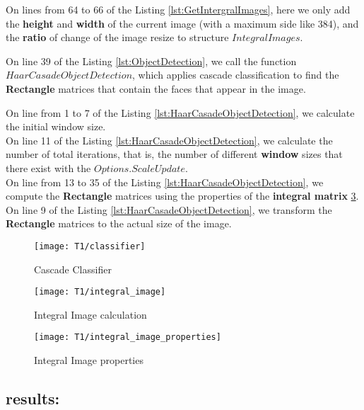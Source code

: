 \noindent On lines from 64 to 66 of the Listing \ref{lst:GetIntergralImages}, here we only add the \textbf{height} and \textbf{width} of the current image (with a maximum side like 384), and the \textbf{ratio} of change of the image resize to structure $IntegralImages$.

\noindent On line 39 of the Listing \ref{lst:ObjectDetection}, we call the function $HaarCasadeObjectDetection$, which applies cascade classification to find the \textbf{Rectangle} matrices that contain the faces that appear in the image.

\noindent On line from 1 to 7 of the Listing \ref{lst:HaarCasadeObjectDetection}, we calculate the initial window size.\\

\noindent On line 11  of the Listing \ref{lst:HaarCasadeObjectDetection}, we calculate the number of total iterations, that is, the number of different \textbf{window} sizes that there exist with the $Options.ScaleUpdate$.\\

\noindent On line from 13 to 35 of the Listing \ref{lst:HaarCasadeObjectDetection}, we compute the \textbf{Rectangle} matrices using the properties of the \textbf{integral matrix} \ref{fig:integral_properties}.\\

\noindent On line 9  of the Listing \ref{lst:HaarCasadeObjectDetection}, we transform the \textbf{Rectangle} matrices to the actual size of the image.



\begin{figure}[h]
	\centering
	\texttt{[image: T1/classifier]}
	\caption{Cascade Classifier}
	\label{fig:slideT1}
\end{figure}
\begin{figure}[h]
	\centering
	\texttt{[image: T1/integral\_image]}
	\caption{Integral Image calculation}
	\label{fig:integral}
\end{figure}
\begin{figure}[h]
	\centering
	\texttt{[image: T1/integral\_image\_properties]}
	\caption{Integral Image properties}
	\label{fig:integral_properties}
\end{figure}

\subsection{results:}

